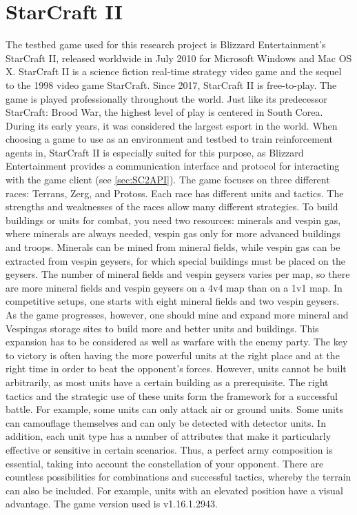 \documentclass[12pt,a4paper]{article}
\begin{document}
\section{StarCraft II}
The testbed game used for this research project is Blizzard Entertainment's StarCraft II, released worldwide in July 2010 for Microsoft Windows and Mac OS X. StarCraft II is a science fiction real-time strategy video game and the sequel to the 1998 video game StarCraft. Since 2017, StarCraft II is free-to-play. The game is played professionally throughout the world. Just like its predecessor StarCraft: Brood War, the highest level of play is centered in South Corea. During its early years, it was considered the largest esport in the world.
When choosing a game to use as an environment and testbed to train reinforcement agents in, StarCraft II is especially suited for this purpose, as Blizzard Entertainment provides a communication interface and protocol for interacting with the game client (see \ref{sec:SC2API}).
The game focuses on three different races: Terrans, Zerg, and Protoss. Each race has different units and tactics. The strengths and weaknesses of the races allow many different strategies.
To build buildings or units for combat, you need two resources: minerals and vespin gas, where minerals are always needed, vespin gas only for more advanced buildings and troops. Minerals can be mined from mineral fields, while vespin gas can be extracted from vespin geysers, for which special buildings must be placed on the geysers. The number of mineral fields and vespin geysers varies per map, so there are more mineral fields and vespin geysers on a 4v4 map than on a 1v1 map.
In competitive setups, one starts with eight mineral fields and two vespin geysers. As the game progresses, however, one should mine and expand more mineral and Vespingas storage sites to build more and better units and buildings. This expansion has to be considered as well as warfare with the enemy party.
The key to victory is often having the more powerful units at the right place and at the right time in order to beat the opponent's forces.
However, units cannot be built arbitrarily, as most units have a certain building as a prerequisite. The right tactics and the strategic use of these units form the framework for a successful battle. For example, some units can only attack air or ground units. Some units can camouflage themselves and can only be detected with detector units. In addition, each unit type has a number of attributes that make it particularly effective or sensitive in certain scenarios. Thus, a perfect army composition is essential, taking into account the constellation of your opponent. There are countless possibilities for combinations and successful tactics, whereby the terrain can also be included. For example, units with an elevated position have a visual advantage.
The game version used is v1.16.1.2943.
\end{document}
